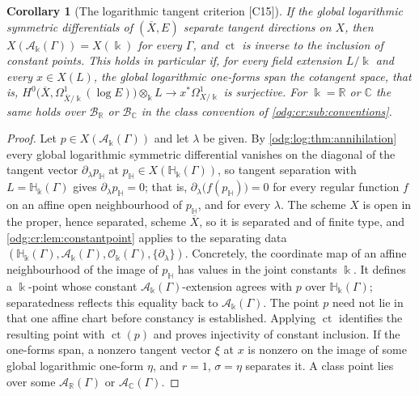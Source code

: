 \documentclass[11pt,oneside]{article}
\numberwithin{equation}{section}
\newtheorem{corollary}[corollary]{Corollary}
\theoremstyle{definition}
\theoremstyle{remark}
\newcommand{\R}{\mathbb R}
\newcommand{\C}{\mathbb C}
\newcommand{\BR}{\mathcal B_{\R}}
\newcommand{\BC}{\mathcal B_{\C}}
\newcommand{\ct}{\operatorname{ct}}
\newcommand{\src}[1]{\textup{\textsf{\small[#1]}}}
\newcommand{\crH}{\mathbb H_\Bbbk(\Gamma)}
\newcommand{\crA}{\mathcal A_\Bbbk(\Gamma)}
\newcommand{\crO}{\mathcal O_\Bbbk(\Gamma)}
\begin{document}
\begin{corollary}[The logarithmic tangent criterion \src{C15}]\label{odg:log:cor:criterion}
If the global logarithmic symmetric differentials of $(\overline X,E)$ separate tangent
directions on $X$, then $X(\crA)=X(\Bbbk)$ for every $\Gamma$, and $\ct$ is inverse to the
inclusion of constant points. This holds in particular if, for every field extension
$L/\Bbbk$ and every $x\in X(L)$, the global logarithmic one-forms span the cotangent
space, that is,
$H^0\bigl(\overline X,\Omega^1_{\overline X/\Bbbk}(\log E)\bigr)\otimes_\Bbbk L\to
x^*\Omega^1_{X/\Bbbk}$ is surjective. For $\Bbbk=\R$ or $\C$ the same holds over $\BR$ or
$\BC$ in the class convention of \cref{odg:cr:sub:conventions}.
\end{corollary}
\begin{proof}
Let $p\in X(\crA)$ and let $\lambda$ be given. By \cref{odg:log:thm:annihilation} every
global logarithmic symmetric differential vanishes on the diagonal of the tangent vector
$\partial_\lambda p_{\mathbb H}$ at $p_{\mathbb H}\in X(\crH)$, so tangent separation with
$L=\crH$ gives $\partial_\lambda p_{\mathbb H}=0$; that is,
$\partial_\lambda\bigl(f(p_{\mathbb H})\bigr)=0$ for every regular function $f$ on an affine
open neighbourhood of $p_{\mathbb H}$, and for every $\lambda$. The scheme $X$ is open in
the proper, hence separated, scheme $\overline X$, so it is separated and of finite type,
and \cref{odg:cr:lem:constantpoint} applies to the separating data
$(\crH,\crA,\crO,\{\partial_\lambda\})$. Concretely, the coordinate map
of an affine neighbourhood of the image of $p_{\mathbb H}$ has values
in the joint constants $\Bbbk$. It defines a $\Bbbk$-point whose constant
$\crA$-extension agrees with $p$ over $\crH$; separatedness reflects
this equality back to $\crA$. The point $p$ need not lie in that one
affine chart before constancy is established. Applying $\ct$ identifies
the resulting point with $\ct(p)$ and proves injectivity of constant
inclusion. If the one-forms span, a nonzero tangent vector $\xi$ at $x$ is
nonzero on the image of some global logarithmic one-form $\eta$, and $r=1$, $\sigma=\eta$
separates it. A class point lies over some $\mathcal A_\R(\Gamma)$ or
$\mathcal A_\C(\Gamma)$.
\end{proof}
\end{document}
